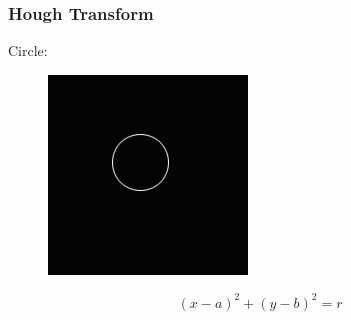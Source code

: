 \documentclass[notheorems,serif,table,compress]{beamer}  %
\begin{document}
\begin{frame}
\frametitle{Hough Transform}
{\color{blue}Circle:}
    \begin{figure}
        \includegraphics[width=0.4\linewidth]{houghcir.png}
    \end{figure}
    \begin{displaymath}
        (x-a)^{2}+(y-b)^{2}=r
    \end{displaymath}
\end{frame}
\end{document}
